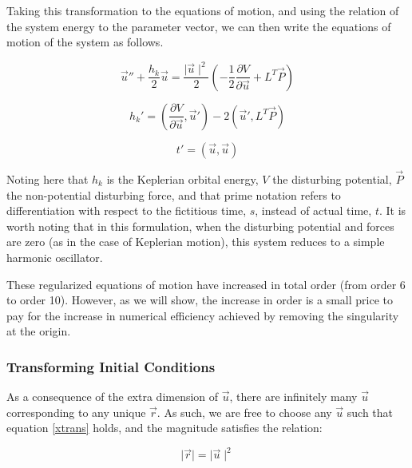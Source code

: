 \documentclass[11pt,twoside,letterpaper]{article}
\begin{document}
  Taking this transformation to the equations of motion, and using the
  relation of the system energy to the parameter vector, we can then
  write the equations of motion of the system as follows.

  \begin{equation} \label{eom}
    \vec{u}'' + \frac{h_k}{2}\vec{u} = \frac{\mid\vec{u}\mid^2}{2}
    \left(-\frac{1}{2}\frac{\partial{V}}{\partial{\vec{u}}} + L^T\vec{P}\right)
  \end{equation}

  \begin{equation} \label{energy_eom}
    h_k' = \left(\frac{\partial{V}}{\partial{\vec{u}}}, \vec{u}'\right)
    - 2\left(\vec{u}',L^T\vec{P}\right)
  \end{equation}

  \begin{equation} \label{time_eom}
    t' = \left(\vec{u}, \vec{u}\right)
  \end{equation}

  Noting here that \(h_k\) is the Keplerian orbital energy, \(V\) the
  disturbing potential, \(\vec{P}\) the non-potential disturbing
  force, and that prime notation refers to differentiation with
  respect to the fictitious time, \(s\), instead of actual time,
  \(t\). It is worth noting that in this formulation, when the
  disturbing potential and forces are zero (as in the case of
  Keplerian motion), this system reduces to a simple harmonic
  oscillator.

  These regularized equations of motion have increased in total order
  (from order 6 to order 10). However, as we will show, the increase
  in order is a small price to pay for the increase in numerical
  efficiency achieved by removing the singularity at the origin.

  \subsubsection{Transforming Initial Conditions}
  As a consequence of the extra dimension of \(\vec{u}\), there are
  infinitely many \(\vec{u}\) corresponding to any unique
  \(\vec{r}\). As such, we are free to choose any \(\vec{u}\) such
  that equation \ref{xtrans} holds, and the magnitude satisfies the
  relation:

  \begin{equation} \label{umag}
    \mid\vec{r}\mid = \mid\vec{u}\mid^2
  \end{equation}
\end{document}
